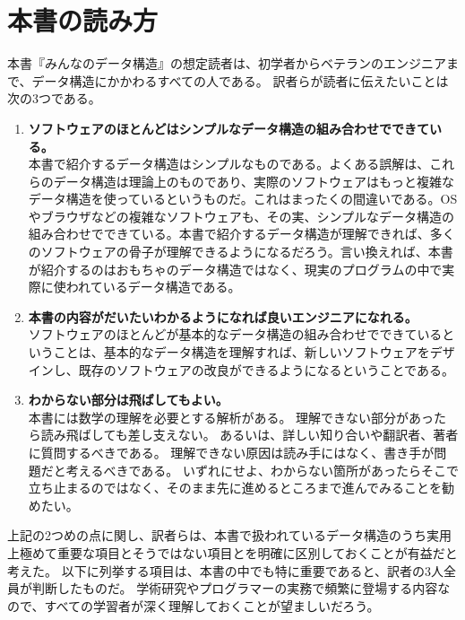 
\section*{本書の読み方}

本書『みんなのデータ構造』の想定読者は、初学者からベテランのエンジニアまで、データ構造にかかわるすべての人である。
訳者らが読者に伝えたいことは次の3つである。

\begin{enumerate}
\item {\bf ソフトウェアのほとんどはシンプルなデータ構造の組み合わせでできている。} \\
本書で紹介するデータ構造はシンプルなものである。よくある誤解は、これらのデータ構造は理論上のものであり、実際のソフトウェアはもっと複雑なデータ構造を使っているというものだ。これはまったくの間違いである。OSやブラウザなどの複雑なソフトウェアも、その実、シンプルなデータ構造の組み合わせでできている。本書で紹介するデータ構造が理解できれば、多くのソフトウェアの骨子が理解できるようになるだろう。言い換えれば、本書が紹介するのはおもちゃのデータ構造ではなく、現実のプログラムの中で実際に使われているデータ構造である。%

\item {\bf 本書の内容がだいたいわかるようになれば良いエンジニアになれる。} \\
ソフトウェアのほとんどが基本的なデータ構造の組み合わせでできているということは、基本的なデータ構造を理解すれば、新しいソフトウェアをデザインし、既存のソフトウェアの改良ができるようになるということである。

\item {\bf わからない部分は飛ばしてもよい。} \\
本書には数学の理解を必要とする解析がある。
理解できない部分があったら読み飛ばしても差し支えない。
あるいは、詳しい知り合いや翻訳者、著者に質問するべきである。
理解できない原因は読み手にはなく、書き手が問題だと考えるべきである。
いずれにせよ、わからない箇所があったらそこで立ち止まるのではなく、そのまま先に進めるところまで進んでみることを勧めたい。

\end{enumerate}

上記の2つめの点に関し、訳者らは、本書で扱われているデータ構造のうち実用上極めて重要な項目とそうではない項目とを明確に区別しておくことが有益だと考えた。
以下に列挙する項目は、本書の中でも特に重要であると、訳者の3人全員が判断したものだ。
学術研究やプログラマーの実務で頻繁に登場する内容なので、すべての学習者が深く理解しておくことが望ましいだろう。

